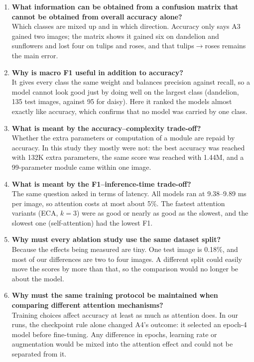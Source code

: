 \documentclass[10pt]{article}
\begin{document}
\begin{enumerate}
\item \textbf{What information can be obtained from a confusion matrix that cannot be obtained from overall accuracy alone?}\\
Which classes are mixed up and in which direction. Accuracy only says A3
gained two images; the matrix shows it gained six on dandelion and sunflowers and
lost four on tulips and roses, and that tulips$\rightarrow$roses remains the main
error.

\item \textbf{Why is macro F1 useful in addition to accuracy?}\\
It gives every class the same weight and balances precision against
recall, so a model cannot look good just by doing well on the largest class
(dandelion, 135 test images, against 95 for daisy). Here it ranked the models
almost exactly like accuracy, which confirms that no model was carried by one
class.

\item \textbf{What is meant by the accuracy--complexity trade-off?}\\
Whether the extra parameters or computation of a module are repaid by
accuracy. In this study they mostly were not: the best accuracy was reached with
132K extra parameters, the same score was reached with 1.44M, and a 99-parameter
module came within one image.

\item \textbf{What is meant by the F1--inference-time trade-off?}\\
The same question asked in terms of latency. All models ran at
9.38--9.89 ms per image, so attention costs at most about 5\%. The fastest
attention variants (ECA, $k=3$) were as good or nearly as good as the slowest,
and the slowest one (self-attention) had the lowest F1.

\item \textbf{Why must every ablation study use the same dataset split?}\\
Because the effects being measured are tiny. One test image is 0.18\%, and
most of our differences are two to four images. A different split could easily
move the scores by more than that, so the comparison would no longer be about
the model.

\item \textbf{Why must the same training protocol be maintained when comparing different attention mechanisms?}\\
Training choices affect accuracy at least as much as attention does. In our
runs, the checkpoint rule alone changed A4's outcome: it selected an epoch-4
model before fine-tuning. Any difference in epochs, learning rate or augmentation
would be mixed into the attention effect and could not be separated from it.


\end{enumerate}
\end{document}
